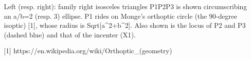 Left (resp. right): family right isosceles triangles P1P2P3 is shown circumscribing an a/b=2 (resp. 3) ellipse. P1 rides on Monge's orthoptic circle (the 90-degree isoptic) [1], whose radius is Sqrt[a^2+b^2]. Also shown is the locus of P2 and P3 (dashed blue) and that of the incenter (X1).

[1] https://en.wikipedia.org/wiki/Orthoptic_(geometry)